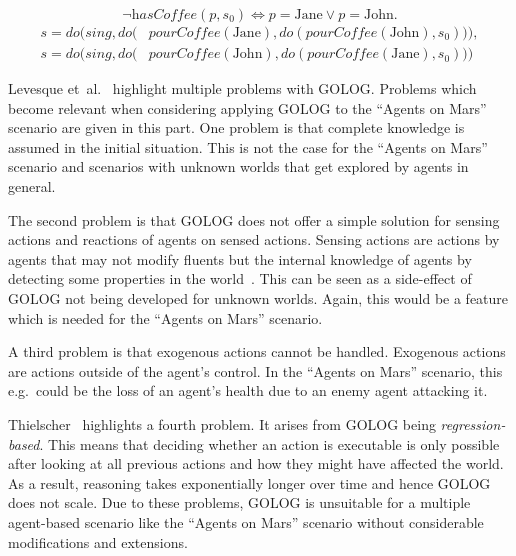 \begin{equation}\label{ex_gologConfiguration}
  \neg\textit{hasCoffee}(p,s_0) \Leftrightarrow p=\textrm{Jane} \vee p=\textrm{John}.
\end{equation}
\begin{equation}\label{ex_situations}
  \begin{split}
    s=\textit{do}\Big(\textit{sing},\textit{do}\big(&\textit{pourCoffee}(\textrm{Jane}),
      \textit{do}(\textit{pourCoffee}(\textrm{John}),s_0)\big)\Big),
\\  s=\textit{do}\Big(\textit{sing},\textit{do}\big(&\textit{pourCoffee}(\textrm{John}),
      \textit{do}(\textit{pourCoffee}(\textrm{Jane}),s_0)\big)\Big)
  \end{split}
\end{equation}

Levesque et~al.~\cite{levesque_golog:_1997} highlight multiple problems with GOLOG.
Problems which become relevant when considering applying GOLOG to the \enquote{Agents on Mars} scenario are given in this part.
One problem is that complete knowledge is assumed in the initial situation.
This is not the case for the \enquote{Agents on Mars} scenario and scenarios with unknown worlds that get explored by agents in general.

The second problem is that GOLOG does not offer a simple solution for sensing actions and reactions of agents on sensed actions.
Sensing actions are actions by agents that may not modify fluents but the internal knowledge of agents by detecting some properties in the world~\cite{thielscher_flux:_2005}.
This can be seen as a side-effect of GOLOG not being developed for unknown worlds.
Again, this would be a feature which is needed for the \enquote{Agents on Mars} scenario.

A third problem is that exogenous actions cannot be handled.
Exogenous actions are actions outside of the agent's control.
In the \enquote{Agents on Mars} scenario, this e.g.\ could be the loss of an agent's health due to an enemy agent attacking it.

Thielscher~\cite{thielscher_flux:_2005} highlights a fourth problem.
It arises from GOLOG being \emph{regression-based}.
This means that deciding whether an action is executable is only possible after looking at all previous actions and how they might have affected the world.
As a result, reasoning takes exponentially longer over time and hence GOLOG does not scale.
Due to these problems, GOLOG is unsuitable for a multiple agent-based scenario like the \enquote{Agents on Mars} scenario without considerable modifications and extensions.
